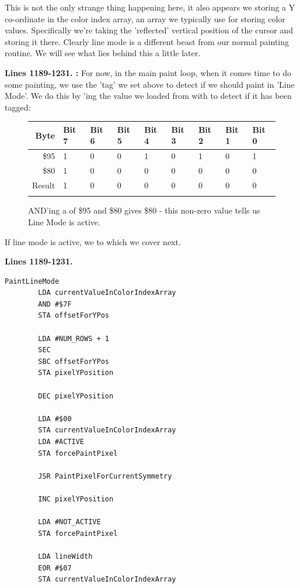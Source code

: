 This is not the only strange thing happening here, it also 
appears we storing a Y co-ordinate in the color index array, an array we typically use for
storing color values. Specifically we're taking the 'reflected' vertical position of the 
cursor and storing it there. Clearly line mode is a different beast from our normal painting routine. We will
see what lies behind this a little later.


\textbf{Lines 1189-1231. :} For now, in the main paint loop, when it comes time to do some
painting, we use the 'tag' we set above to detect if we should paint in 'Line Mode'. We do this by 'ing the
value we loaded from  with  to detect if it has been tagged:

\begin{figure}[H]
  {
    \setlength{\tabcolsep}{3.0pt}
    \setlength\cmidrulewidth{\heavyrulewidth} %
    \begin{adjustbox}{width=7cm,center}

      \begin{tabular}{rllllllll}
        \toprule
        Byte & Bit 7 & Bit 6 & Bit 5 & Bit 4 & Bit 3 & Bit 2 & Bit 1 & Bit 0        \\
        \midrule
        \$95 & 1 & 0 & 0 & 1 & 0 & 1 & 0 & 1 \\
        \$80 & 1 & 0 & 0 & 0 & 0 & 0 & 0 & 0 \\
        \midrule
      Result & 1 & 0 & 0 & 0 & 0 & 0 & 0 & 0 \\
        \addlinespace
        \bottomrule
      \end{tabular}

    \end{adjustbox}

  }\caption*{AND'ing a  of \$95 and \$80 gives \$80 - this non-zero value tells us Line Mode is active.}
\end{figure}

If line mode is active, we  to  which we cover next.

\clearpage
\textbf{Lines 1189-1231. } 
\begin{lstlisting}[caption=From \icode{PaintLineMode}.]
PaintLineMode 
        LDA currentValueInColorIndexArray
        AND #$7F
        STA offsetForYPos

        LDA #NUM_ROWS + 1
        SEC 
        SBC offsetForYPos
        STA pixelYPosition

        DEC pixelYPosition

        LDA #$00
        STA currentValueInColorIndexArray
        LDA #ACTIVE
        STA forcePaintPixel

        JSR PaintPixelForCurrentSymmetry

        INC pixelYPosition

        LDA #NOT_ACTIVE
        STA forcePaintPixel

        LDA lineWidth
        EOR #$07
        STA currentValueInColorIndexArray
\end{lstlisting}
\clearpage

